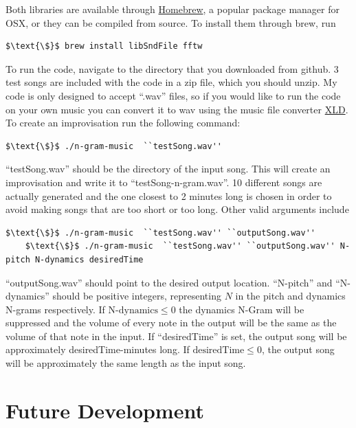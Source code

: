 \documentclass{amsart}
\theoremstyle{definition}
\begin{document}
Both libraries are available through
\href{http://brew.sh}{Homebrew},
a popular package manager for OSX, or they can be compiled from source.
To install them through brew, run

\begin{lstlisting}[style=code]
    $\text{\$}$ brew install libSndFile fftw
\end{lstlisting}

To run the code, navigate to the directory that you downloaded from github. 
3 test songs are included with the code in a zip file, which you should unzip.
My code is only designed to accept ``.wav'' files, so if you would like to run 
the code on your own music you can convert it to wav using the music file converter
\href{http://sourceforge.net/projects/xld/}{XLD}. 
To create an improvisation run the following command:

\begin{lstlisting}[style=code]
    $\text{\$}$ ./n-gram-music  ``testSong.wav''
\end{lstlisting}

``testSong.wav'' should be the directory of the input song. 
This will create an improvisation and write it to ``testSong-n-gram.wav''.
10 different songs are actually generated and the one closest to 2 minutes long is chosen in order to avoid making songs that are too short or too long.
Other valid arguments include 
\begin{lstlisting}[style=code]
    $\text{\$}$ ./n-gram-music  ``testSong.wav'' ``outputSong.wav''
    $\text{\$}$ ./n-gram-music  ``testSong.wav'' ``outputSong.wav'' N-pitch N-dynamics desiredTime
\end{lstlisting}

``outputSong.wav'' should point to the desired output location. ``N-pitch'' and ``N-dynamics'' should be positive integers, representing $N$ in the pitch and dynamics N-grams respectively. If $\text{N-dynamics}\leq 0$ the dynamics N-Gram will be suppressed and the volume of every note in the output will be the same as the volume of that note in the input. 
If ``desiredTime'' is set, the output song will be approximately desiredTime-minutes long.
If $\text{desiredTime}\leq 0$, the output song will be approximately the same length as the input song.


\section{Future Development}
\end{document}
